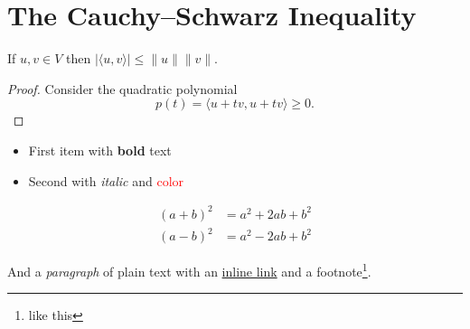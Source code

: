 \section{The Cauchy--Schwarz Inequality}

\begin{theorem}
If $u, v \in V$ then $|\langle u, v \rangle| \le \|u\| \|v\|$.
\end{theorem}

\begin{proof}
Consider the quadratic polynomial
$$p(t) = \langle u + t v, u + t v \rangle \ge 0.$$
\end{proof}

\begin{itemize}
\item First item with \textbf{bold} text
\item Second with \textit{italic} and \textcolor{red}{color}
\end{itemize}

\begin{align}
(a+b)^2 &= a^2 + 2ab + b^2 \\
(a-b)^2 &= a^2 - 2ab + b^2
\end{align}

\noindent And a \emph{paragraph} of plain text with an \href{https://latex2js.com}{inline link} and a footnote\footnote{like this}.
